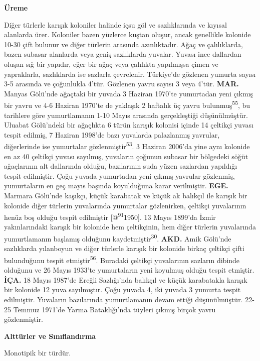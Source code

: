 \documentclass[
  letterpaper,
  DIV=11,
  numbers=noendperiod]{scrreprt}
\begin{document}
\textbf{Üreme}

Diğer türlerle karışık koloniler halinde içsu göl ve sazlıklarında ve
kıyısal alanlarda ürer. Koloniler bazen yüzlerce kuştan oluşur, ancak
genellikle kolonide 10-30 çift bulunur ve diğer türlerin arasında
azınlıktadır. Ağaç ve çalılıklarda, bazen subasar alanlarda veya geniş
sazlıklarda yuvalar. Yuvası ince dallardan oluşan sığ bir yapıdır, eğer
bir ağaç veya çalılıkta yapılmışsa çimen ve yapraklarla, sazlıklarda ise
sazlarla çevrelenir. Türkiye'de gözlenen yumurta sayısı 3-5 arasında ve
çoğunlukla 4'tür. Gözlenen yavru sayısı 3 veya 4'tür. \textbf{MAR.}
Manyas Gölü'nde ağaçtaki bir yuvada 3 Haziran 1970'te yumurtadan yeni
çıkmış bir yavru ve 4-6 Haziran 1970'te de yaklaşık 2 haftalık üç yavru
bulunmuş\textsuperscript{55}, bu tarihlere göre yumurtlamanın 1-10 Mayıs
arasında gerçekleştiği düşünülmüştür. Uluabat Gölü'ndeki bir ağaçlıkta 6
türün karışık kolonisi içinde 14 çeltikçi yuvası tespit edilmiş, 7
Haziran 1998'de bazı yuvalarda palazlanmış yavrular, diğerlerinde ise
yumurtalar gözlenmiştir\textsuperscript{53}. 3 Haziran 2006'da yine aynı
kolonide en az 40 çeltikçi yuvası sayılmış, yuvaların çoğunun subasar
bir bölgedeki söğüt ağaçlarının alt dallarında olduğu, bazılarının suda
yüzen sazlardan yapıldığı tespit edilmiştir. Çoğu yuvada yumurtadan yeni
çıkmış yavrular gözlenmiş, yumurtaların en geç mayıs başında koyulduğuna
karar verilmiştir. \textbf{EGE.} Marmara Gölü'nde kaşıkçı, küçük
karabatak ve küçük ak balıkçıl ile karışık bir kolonide diğer türlerin
yuvalarında yumurtalar gözlenirken, çeltikçi yuvalarının henüz boş
olduğu tespit edilmiştir {[}@\textsuperscript{91}1950{]}. 13 Mayıs
1899'da İzmir yakınlarındaki karışık bir kolonide hem çeltikçinin, hem
diğer türlerin yuvalarında yumurtlamanın başlamış olduğunu
kaydetmiştir\textsuperscript{30}. \textbf{AKD.} Amik Gölü'nde
sazlıklarda yılanboyun ve diğer türlerle karışık bir kolonide birkaç
çeltikçi çifti bulunduğunu tespit etmiştir\textsuperscript{56}. Buradaki
çeltikçi yuvalarının sazların dibinde olduğunu ve 26 Mayıs 1933'te
yumurtaların yeni koyulmuş olduğu tespit etmiştir. \textbf{İÇA.} 18
Mayıs 1987'de Ereğli Sazlığı'nda balıkçıl ve küçük karabatakla karışık
bir kolonide 12 yuva sayılmıştır. Çoğu yuvada 4, iki yuvada 3 yumurta
tespit edilmiştir. Yuvaların bazılarında yumurtlamanın devam ettiği
düşünülmüştür. 22-25 Temmuz 1971'de Yarma Bataklığı'nda tüyleri çıkmış
birçok yavru gözlenmiştir.

\textbf{Alttürler ve Sınıflandırma}

Monotipik bir türdür.
\end{document}
